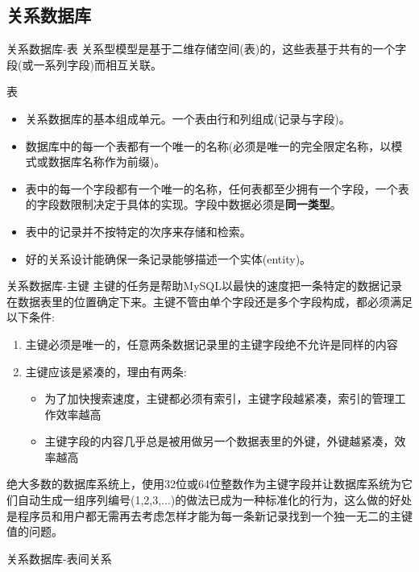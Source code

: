 \documentclass[CJK]{beamer}
\begin{document}
\begin{CJK*}{UTF8}{gbsn}
\subsection{关系数据库}
\begin{frame}{关系数据库-表}
关系型模型是基于二维存储空间(表)的，这些表基于共有的一个字段(或一系列字段)而相互关联。
	\begin{block}{表}
		\begin{itemize}
		\item 关系数据库的基本组成单元。一个表由行和列组成(记录与字段)。
		\item 数据库中的每一个表都有一个唯一的名称(必须是唯一的完全限定名称，以模式或数据库名称作为前缀)。
		\item 表中的每一个字段都有一个唯一的名称，任何表都至少拥有一个字段，一个表的字段数限制决定于具体的实现。字段中数据必须是{\bf 同一类型}。
		\item 表中的记录并不按特定的次序来存储和检索。
		\item 好的关系设计能确保一条记录能够描述一个实体(entity)。
		\end{itemize}
	\end{block}	
\end{frame}
{\small
\begin{frame}{关系数据库-主键}
主键的任务是帮助MySQL以最快的速度把一条特定的数据记录在数据表里的位置确定下来。主键不管由单个字段还是多个字段构成，都必须满足以下条件:
	\begin{block}{}
		\begin{enumerate}
			\item 主键必须是唯一的，任意两条数据记录里的主键字段绝不允许是同样的内容
			\item 主键应该是紧凑的，理由有两条:
			\begin{itemize}
				\item {\tiny 为了加快搜索速度，主键都必须有索引，主键字段越紧凑，索引的管理工作效率越高}
				\item {\tiny 主键字段的内容几乎总是被用做另一个数据表里的外键，外键越紧凑，效率越高}
			\end{itemize}
		\end{enumerate}
		绝大多数的数据库系统上，使用32位或64位整数作为主键字段并让数据库系统为它们自动生成一组序列编号(1,2,3,...)的做法已成为一种标准化的行为，这么做的好处是{\color{blue}程序员和用户都无需再去考虑怎样才能为每一条新记录找到一个独一无二的主键值的问题}。
	\end{block}
\end{frame}
}
\begin{frame}{关系数据库-表间关系}

\end{frame}
\end{CJK*}
\end{document}
